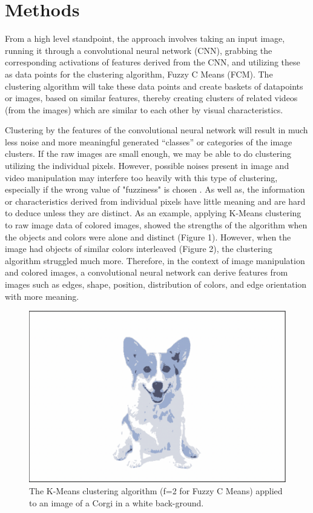 \documentclass[10pt,twocolumn]{article}
\begin{document}
\section {Methods}

From a high level standpoint, the approach involves taking an input image, running it through a convolutional neural network (CNN), grabbing the corresponding activations of features derived from the CNN, and utilizing these as data points for the clustering algorithm, Fuzzy C Means (FCM). The clustering algorithm will take these data points and create baskets of datapoints or images, based on similar features, thereby creating clusters of related videos (from the images) which are similar to each other by visual characteristics. 

Clustering by the features of the convolutional neural network will result in much less noise and more meaningful generated “classes” or categories of the image clusters. If the raw images are small enough, we may be able to do clustering utilizing the individual pixels. However, possible noises present in image and video manipulation may interfere too heavily with this type of clustering, especially if the wrong value of "fuzziness" is chosen \cite{Zhang2019}. As well as, the information or characteristics derived from individual pixels have little meaning and are hard to deduce unless they are distinct. As an example, applying K-Means clustering to raw image data of colored images, showed the strengths of the algorithm when the objects and colors were alone and distinct (Figure 1). However, when the image had objects of similar colors interleaved (Figure 2), the clustering algorithm struggled much more. Therefore, in the context of image manipulation and colored images, a convolutional neural network can derive features from images such as edges, shape, position, distribution of colors, and edge orientation \cite{Lavrenko2014} with more meaning.

\begin{figure}[h]
 \centering
 \includegraphics[scale=0.2]{corgi-white.png}
 \vspace{20px}
 \caption{The K-Means clustering algorithm (f=2 for Fuzzy C Means) applied to an image of a Corgi in a white back-ground.}
 \label{corgi:white}
\end{figure}
\end{document}
